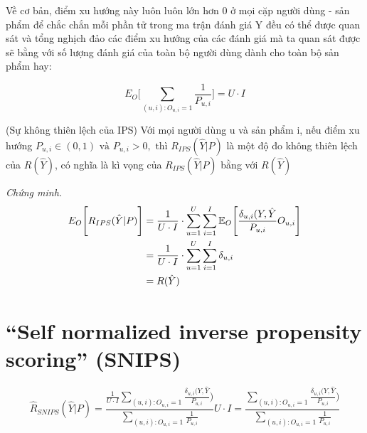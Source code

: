 Về cơ bản, điểm xu hướng này luôn luôn lớn hơn 0 ở mọi cặp người dùng - sản phẩm để chắc chắn mỗi phần tử trong ma trận đánh giá Y đều có thể được quan sát và tổng nghịch đảo các điểm xu hướng của các đánh giá mà ta quan sát được sẽ bằng với số lượng đánh giá của toàn bộ người dùng dành cho toàn bộ sản phẩm hay:

\begin{equation}
\label{eq:EO}
E_O\bigg[\sum_{(u,i):O_{u,i}=1} \frac{1}{P_{u,i}}\bigg] = U \cdot I
\end{equation}

\begin{lemma}
(Sự không thiên lệch của IPS)
Với mọi người dùng u và sản phẩm i, nếu điểm xu hướng $P_{u,i} \in (0,1)\text{ và }  P_{u,i}>0, \text{ thì }  R_{IPS}(\hat{Y}|P)$ là một độ đo không thiên lệch của $R(\hat{Y})$, có nghĩa là kì vọng của $R_{IPS}(\hat{Y}|P)$ bằng với $R(\hat{Y})$
\end{lemma}

\textit{Chứng minh.} 
\begin{equation}
\begin{aligned}
\mathcal\mathbb{E}_{O} \Bigg[R_{IPS}(\hat{Y}|P)\Bigg] &=  \frac{1}{U\cdot I} \cdot \sum_{u=1}^{U} \sum_{i=1}^{I} \mathbb{E}_{O} \Bigg[ \frac{\delta_{u,i}(Y,\hat{Y}}{P_{u,i}}{O_{u,i}}\Bigg] \\ &= \frac{1}{U\cdot I} \cdot \sum_{u=1}^{U} \sum_{i=1}^{I}\delta_{u,i} \\ &
= R(\hat{Y})
\end{aligned}
\end{equation}

\section{``Self normalized inverse propensity scoring'' (SNIPS)}


\begin{equation}
\label{eq:snips}
\hat{R}_{SNIPS}(\hat{Y}|P) = \frac{\frac{1}{U \cdot I}\sum_{(u,i):O_{u,i}=1} \frac{ \delta_{u,i} (Y,\hat{Y}}{P_{u,i}})}{\sum_{(u,i):O_{u,i}=1} \frac{1}{P_{u,i}}} U \cdot I = \frac{\sum_{(u,i):O_{u,i}=1} \frac{ \delta_{u,i} (Y,\hat{Y}}{P_{u,i}})}{\sum_{(u,i):O_{u,i}=1} \frac{1}{P_{u,i}}}
\end{equation}

